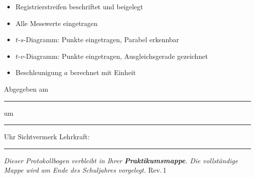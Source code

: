 \documentclass[11pt,a4paper]{scrartcl}
\begin{document}
	\vspace{1.5cm}
	
	\begin{hilfebox}[title={\faIcon{lightbulb} Checkliste vor Abgabe}]
		\begin{itemize}
			\item[$\square$] Registrierstreifen beschriftet und beigelegt
			\item[$\square$] Alle Messwerte eingetragen
			\item[$\square$] $t$-$s$-Diagramm: Punkte eingetragen, Parabel erkennbar
			\item[$\square$] $t$-$v$-Diagramm: Punkte eingetragen, Ausgleichsgerade gezeichnet
			\item[$\square$] Beschleunigung $a$ berechnet mit Einheit
		\end{itemize}
	\end{hilfebox}
	

	\vspace{0.4cm}
	\begin{tcolorbox}[colback=yellow!8, colframe=black, boxrule=0.6pt, title={\faIcon{check-circle}\enspace Abgabevermerk -- wird vor Ort ausgefüllt}, fonttitle=\bfseries]
		Abgegeben am \rule{2.8cm}{0.4pt} \enspace um \rule{2cm}{0.4pt} Uhr \hfill Sichtvermerk Lehrkraft: \rule{3.5cm}{0.4pt}

		\vspace{0.15cm}
		{\small\textit{Dieser Protokollbogen verbleibt in Ihrer \textbf{Praktikumsmappe}. Die vollständige Mappe wird am Ende des Schuljahres vorgelegt.} \hfill \scriptsize Rev.\,1}
	\end{tcolorbox}
\end{document}

